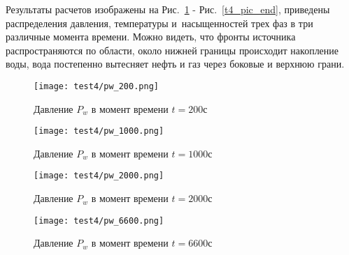 Результаты расчетов изображены на Рис.~\ref{t4_pic_start} - Рис.~\ref{t4_pic_end}, приведены распределения давления, температуры
и~насыщенностей трех фаз в три различные момента времени. Можно видеть, что фронты источника распространяются по
области, около нижней границы происходит накопление воды, вода постепенно вытесняет нефть и газ через боковые и верхнюю грани.

\begin{figure}
  \begin{center}
    \begin{minipage}[h]{0.49\textwidth}
       \texttt{[image: test4/pw\_200.png]}
       \vspace{1cm}
       \caption{Давление $P_w$ в момент времени $t=200$с}
       \label{t4_pic_start}
    \end{minipage}
    \hfill
    \begin{minipage}[h]{0.49\textwidth}
       \texttt{[image: test4/pw\_1000.png]}
       \vspace{1cm}
       \caption{Давление $P_w$ в момент времени $t=1000$с}
    \end{minipage}
    \vspace{3cm}
    \vfill
    \begin{minipage}[h]{0.49\textwidth}
       \texttt{[image: test4/pw\_2000.png]}
       \vspace{1cm}
       \caption{Давление $P_w$ в момент времени $t=2000$с}
    \end{minipage}
    \hfill
    \begin{minipage}[h]{0.49\textwidth}
       \texttt{[image: test4/pw\_6600.png]}
       \vspace{1cm}
       \caption{Давление $P_w$ в момент времени $t=6600$с}
    \end{minipage}
    \hfill  
  \end{center}
\end{figure}

